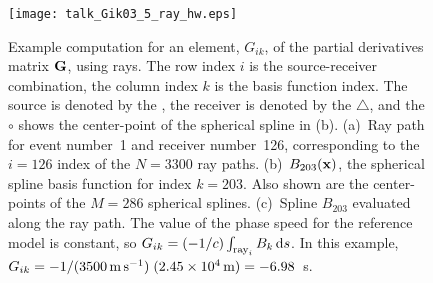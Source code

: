 \documentclass[11pt,titlepage,fleqn]{article}
\begin{document}
\begin{figure}[p]
\hspace{-1.5cm}
\texttt{[image: talk\_Gik03\_5\_ray\_hw.eps]}
\caption[Basis function]
{{
Example computation for an element, $G_{ik}$, of the partial derivatives matrix $\mbox{${\bf G}$}$, using rays. The row index $i$ is the source-receiver combination, the column index $k$ is the basis function index. The source is denoted by the , the receiver is denoted by the $\triangle$, and the $\circ$ shows the center-point of the spherical spline in (b).
(a)~Ray path for event number~1 and receiver number~126, corresponding to the $i=126$ index of the $N=3300$ ray paths.
(b)~$B_{203}(\mbox{${\bf x}$})$, the spherical spline basis function for index $k=203$. Also shown are the center-points of the $M=286$ spherical splines.
(c)~Spline $B_{203}$ evaluated along the ray path. The value of the phase speed for the reference model is constant, so $G_{ik} = (-1/c) \int_{{\rm ray}_i} B_k\,\mathrm{d} s$. In this example, $G_{ik} = -1/(3500\,{\rm m\,s^{-1}})\;(2.45 \times 10^4\,{\rm m})  = -6.98$~s. 
\label{fig:basis}
}}
\end{figure}

\end{document}
